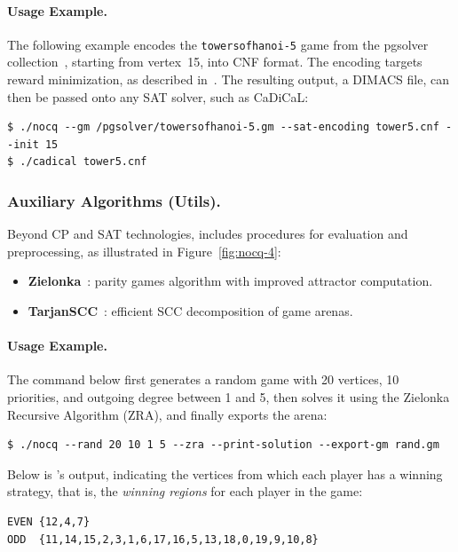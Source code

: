 \documentclass[runningheads]{llncs}
\begin{document}
\paragraph{Usage Example.}
The following example encodes the \texttt{towersofhanoi-5} game from the pgsolver collection~\cite{Friedmann:2017}, starting from vertex~15, into CNF format. The encoding targets reward minimization, as described in~\cite{Heljanko:2012}. The resulting output, a DIMACS file, can then be passed onto any SAT solver, such as CaDiCaL:

\begin{lstlisting}
$ ./nocq --gm /pgsolver/towersofhanoi-5.gm --sat-encoding tower5.cnf --init 15
$ ./cadical tower5.cnf
\end{lstlisting}

\subsubsection*{Auxiliary Algorithms (Utils).}

Beyond CP and SAT technologies, \nocq includes procedures for evaluation and preprocessing, as illustrated in Figure~\ref{fig:nocq-4}:

\begin{itemize}
    \item \textbf{Zielonka}~\cite{Araya:2008}: parity games algorithm with improved attractor computation.
    \item \textbf{TarjanSCC}~\cite{Tarjan:1972}: efficient SCC decomposition of game arenas.
\end{itemize}

\paragraph{Usage Example.}
The command below first generates a random game with 20 vertices, 10 priorities, and outgoing degree between 1 and 5, then solves it using the Zielonka Recursive Algorithm (ZRA), and finally exports the arena:
\begin{lstlisting}
$ ./nocq --rand 20 10 1 5 --zra --print-solution --export-gm rand.gm
\end{lstlisting}

\noindent Below is \nocq's output, indicating the vertices from which each player has a winning strategy, that is, the {\em winning regions} for each player in the game:
\begin{lstlisting}
EVEN {12,4,7}
ODD  {11,14,15,2,3,1,6,17,16,5,13,18,0,19,9,10,8}
\end{lstlisting}
\end{document}
